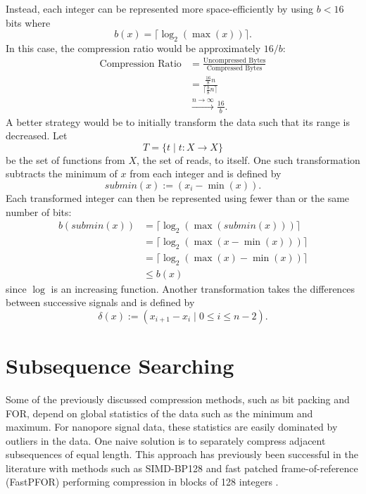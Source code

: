 Instead, each integer can be represented more space-efficiently by using $b<16$ bits where \[b(x)=\lceil\log_2(\max(x))\rceil.\] In this case, the compression ratio would be approximately $16/b$:
\begin{align*}
	\text{Compression Ratio} &= \frac{\text{Uncompressed Bytes}}{\text{Compressed Bytes}}\\
	&=\frac{\frac{16}{8}n}{\lceil\frac{b}{8}n\rceil}\\
	&\stackrel{n\to\infty}{\longrightarrow}\frac{16}{b}.
\end{align*}
A better strategy would be to initially transform the data such that its range is decreased.
Let \[T=\{t\mid t:X\to X\}\] be the set of functions from $X$, the set of reads, to itself. One such transformation subtracts the minimum of $x$ from each integer and is defined by \[ submin(x) := (x_i-\min(x)). \] Each transformed integer can then be represented using fewer than or the same number of bits:
\begin{align*}
	b(submin(x))&=\lceil\log_2(\max(submin(x)))\rceil\\
	&=\lceil\log_2(\max(x-\min(x)))\rceil\\
	&=\lceil\log_2(\max(x)-\min(x))\rceil\\
	&\le b(x)
\end{align*}
since $\log$ is an increasing function.
Another transformation takes the differences between successive signals and is defined by
\[ \delta(x):=(x_{i+1}-x_i\mid 0\le i\le n-2).\]

\section{Subsequence Searching}
Some of the previously discussed compression methods, such as bit packing and FOR, depend on global statistics of the data such as the minimum and maximum.
For nanopore signal data, these statistics are easily dominated by outliers in the data.
One naive solution is to separately compress adjacent subsequences of equal length.
This approach has previously been successful in the literature with methods such as SIMD-BP128 and fast patched frame-of-reference (FastPFOR) performing compression in blocks of 128 integers \cite{lemire-simd}.

